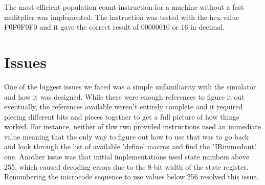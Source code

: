 \documentclass[acmtog]{acmart}
\begin{document}
The most efficient population count instruction for a machine without a fast mulitplier was implemented. The instruction was tested with the hex value F0F0F0F0 and it gave the correct result of 00000010 or 16 in decimal.

\section{Issues}
One of the biggest issues we faced was a simple unfamiliarity with the simulator and how it was designed. While there were enough references to figure it out
eventually, the references available weren't entirely complete and it required piecing different bits and pieces together to get a full picture of how things
worked. For instance, neither of thw two provided instructions used an immediate value meaning that the only way to figure out how to use that was to go back 
and look through the list of available 'define' macros and find the "IRimmedout" one.
Another issue was that initial implementations used state numbers above 255, which caused decoding errors due to the 8‑bit width of the state register. 
Renumbering the microcode sequence to use values below 256 resolved this issue.
\end{document}
